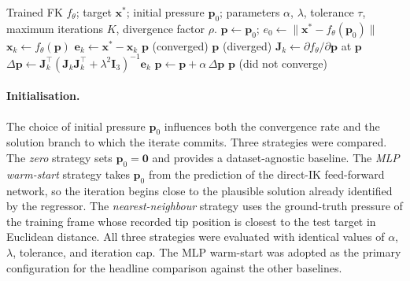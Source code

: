 \begin{algorithm}[ht]
\caption{Jacobian-learned inverse kinematics for one target.}
\label{alg:jacobian_ik}
\begin{algorithmic}[1]
\Require Trained FK $f_{\theta}$; target $\mathbf{x}^{*}$; initial pressure $\mathbf{p}_0$; parameters $\alpha$, $\lambda$, tolerance $\tau$, maximum iterations $K$, divergence factor $\rho$.
\State $\mathbf{p} \gets \mathbf{p}_0$; \quad $e_0 \gets \| \mathbf{x}^{*} - f_{\theta}(\mathbf{p}_0) \|$
  \State $\mathbf{x}_k \gets f_{\theta}(\mathbf{p})$
  \State $\mathbf{e}_k \gets \mathbf{x}^{*} - \mathbf{x}_k$
    \State \Return $\mathbf{p}$ (converged)
  \EndIf
    \State \Return $\mathbf{p}$ (diverged)
  \EndIf
  \State $\mathbf{J}_k \gets \partial f_{\theta} / \partial \mathbf{p}$ at $\mathbf{p}$
  \State $\Delta \mathbf{p} \gets \mathbf{J}_k^{\top} (\mathbf{J}_k \mathbf{J}_k^{\top} + \lambda^{2} \mathbf{I}_3)^{-1} \mathbf{e}_k$
  \State $\mathbf{p} \gets \mathbf{p} + \alpha \, \Delta \mathbf{p}$
\EndFor
\State \Return $\mathbf{p}$ (did not converge)
\end{algorithmic}
\end{algorithm}

\paragraph{Initialisation.}
The choice of initial pressure $\mathbf{p}_0$ influences both the convergence rate and the solution branch to which the iterate commits. Three strategies were compared. The \emph{zero} strategy sets $\mathbf{p}_0 = \mathbf{0}$ and provides a dataset-agnostic baseline. The \emph{MLP warm-start} strategy takes $\mathbf{p}_0$ from the prediction of the direct-IK feed-forward network, so the iteration begins close to the plausible solution already identified by the regressor. The \emph{nearest-neighbour} strategy uses the ground-truth pressure of the training frame whose recorded tip position is closest to the test target in Euclidean distance. All three strategies were evaluated with identical values of $\alpha$, $\lambda$, tolerance, and iteration cap. The MLP warm-start was adopted as the primary configuration for the headline comparison against the other baselines.

